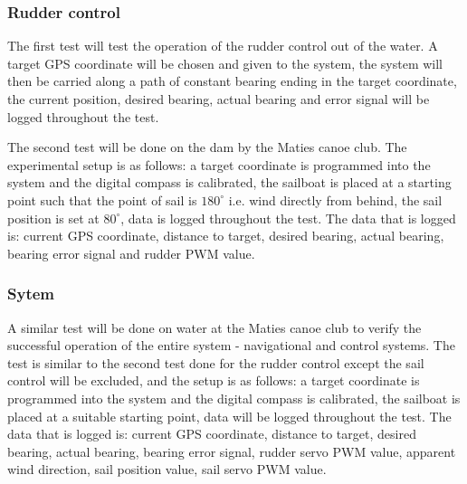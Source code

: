 \subsubsection{Rudder control}
The first test will test the operation of the rudder control out of the water. A target GPS coordinate will be chosen and given to the system, the system 
will then be carried along a path of constant bearing ending in the target coordinate, the current position, desired bearing, actual bearing and error signal
will be logged throughout the test. 

The second test will be done on the dam by the Maties canoe club. The experimental setup is as follows: a target coordinate is programmed into the system and 
the digital compass is calibrated, the sailboat is placed at a starting point such that the point of sail is $180^{\circ}$ i.e. wind directly from behind, the
sail position is set at $80^{\circ}$, data is logged throughout the test. The data that is logged is: current GPS coordinate, distance to target, desired bearing, 
actual bearing, bearing error signal and rudder PWM value.

\subsubsection{Sytem}
A similar test will be done on water at the Maties canoe club to verify the successful operation of the entire system - navigational and control systems. The test
is similar to the second test done for the rudder control except the sail control will be excluded, and the setup is as follows: a target coordinate is 
programmed into the system and the digital compass is calibrated, the sailboat is placed at a suitable starting point, data will be logged throughout the test. 
The data that is logged is: current GPS coordinate, distance to target, desired bearing, actual bearing, bearing error signal, rudder servo PWM value, apparent 
wind direction, sail position value, sail servo PWM value.





